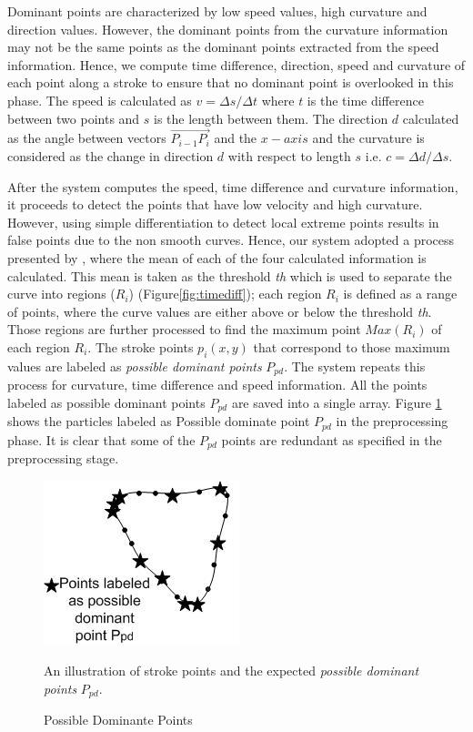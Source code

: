 \documentclass[preprint,10pt,5p,twocolumn]{elsarticle}
\begin{document}
Dominant points are characterized by low speed values, high curvature and direction values. However, the dominant points from the curvature information may not be the same points as the dominant points extracted from the speed information. Hence, we compute time difference, direction, speed and curvature of each point along a stroke to ensure that no dominant point is overlooked in this phase. The speed is calculated as $v=\Delta s/\Delta t$ where $t$ is the time difference between two points and $s$ is the length between them. The direction $d$ calculated as the angle between vectors $\overrightarrow {P_{i - 1} P_i }$ and the $x-axis$ and the curvature is considered as the change in direction $d$ with respect to length $s$ i.e. $c= \Delta d/\Delta s$. 
  
After the system computes the speed, time difference and curvature information, it proceeds to detect the points that have low velocity and high curvature. However, using simple differentiation to detect local extreme points results in false points due to the non smooth curves. Hence, our system adopted a process presented by \cite{earlyprocess}, where the mean of each of the four calculated information  is calculated. This mean is taken as the threshold \textit{th} which is used to separate the curve into regions ($R_i$) (Figure\ref{fig:timediff}); each region $R_i$ is defined as a range of points, where the curve values are either above or below the threshold \textit{th}. Those regions are further processed to find the maximum point $Max(R_i)$ of each region $R_i$. The stroke points $p_i(x,y)$ that correspond to those maximum values are labeled as \textit{possible dominant points} $P_{pd}$. The system repeats this process for curvature, time difference and speed information. All the points labeled as possible dominant points $P_{pd}$ are saved into a single array. Figure \ref{fig:ppd999} shows the particles labeled as Possible dominate point $P_{pd}$ in the preprocessing phase. It is clear that some of the $P_{pd}$ points are redundant as specified in the preprocessing stage. %
\begin{figure}
	\centering
\includegraphics[scale=0.7]{images/ppd.jpg}
	\caption{Possible Dominante Points} An illustration of stroke points and the expected \textit{possible dominant points} $P_{pd}$.  
	\label{fig:ppd999}	
\end{figure}
\end{document}
